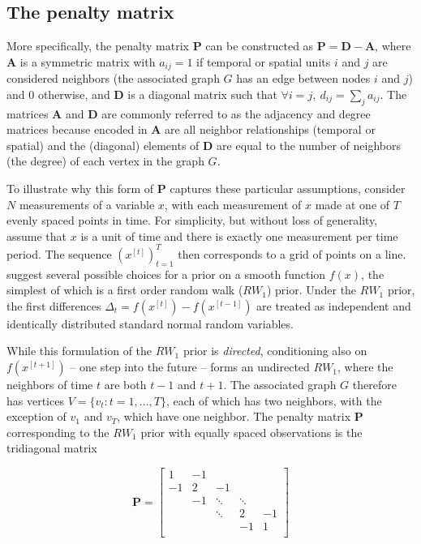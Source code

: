 \subsection{The penalty matrix} 
\label{penalty_matrix}

More specifically, the penalty matrix $\mathbf{P}$ can be constructed as  $\mathbf{P} = \mathbf{D} - \mathbf{A}$, where $\mathbf{A}$ is a symmetric matrix with $a_{ij} = 1$ if temporal or spatial units $i$ and $j$ are considered neighbors (the associated graph $G$ has an edge between nodes $i$ and $j$) and 0 otherwise, and $\mathbf{D}$ is a diagonal matrix such that $\forall i = j, \: d_{ij} = \sum_j a_{ij}$. The matrices $\mathbf{A}$ and $\mathbf{D}$ are commonly referred to as the adjacency and degree matrices because encoded in $\mathbf{A}$ are all neighbor relationships (temporal or spatial) and the (diagonal) elements of $\mathbf{D}$ are equal to the number of neighbors (the degree) of each vertex in the graph $G$. 

To illustrate why this form of $\mathbf{P}$ captures these particular assumptions, consider $N$ measurements of a variable $x$, with each measurement of $x$ made at one of $T$ evenly spaced points in time. For simplicity, but without loss of generality,  assume that $x$ is a unit of time and there is exactly one measurement per time period.  The sequence $(x^{[t]})_{t=1}^T$ then corresponds to a grid of points on a line.   suggest several possible choices for a prior on a smooth function $f(x)$, the simplest of which is a first order random walk ($RW_1$) prior.  Under the $RW_1$ prior, the first differences $\Delta_t = f(x^{[t]}) - f(x^{[t-1]})$ are treated as independent and identically distributed standard normal random variables. 

While this formulation of the $RW_1$ prior is {\it directed}, conditioning also on $f(x^{[t+1]})$ -- one step into the future -- forms an undirected $RW_1$, where the neighbors of time $t$ are both $t-1$ and $t+1$.  The associated graph $G$ therefore has vertices $V=\{v_t : t=1,\dots,T\}$, each of which has two neighbors, with the exception of $v_1$ and $v_T$, which have one neighbor. The penalty matrix $\mathbf{P}$ corresponding to the $RW_1$ prior with equally spaced observations is the tridiagonal matrix

\begin{equation*}
\mathbf{P} = 
\begin{bmatrix}
1  	& -1 	& 		& 	& \\
-1  	& 2 	& -1 		& 	& \\
  	& -1 	& \ddots 	& \ddots	& \\
  	&  	& \ddots 	& 2 	& -1\\
  	&  	& 		& -1 	& 1\\
\end{bmatrix}
\end{equation*}


